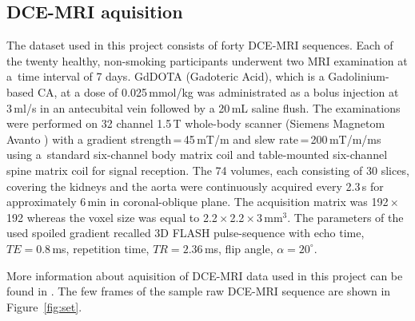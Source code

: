\subsection{DCE-MRI aquisition}
The dataset used in this project consists of forty DCE-MRI sequences. Each of the twenty healthy, non-smoking participants underwent two MRI examination at a~time interval of 7 days.
GdDOTA (Gadoteric Acid), which is a Gadolinium-based CA,  at a dose of 0.025\,mmol/kg was administrated as a bolus injection at 3\,ml/s in an antecubital vein followed by a 20\,mL saline flush.
The examinations were performed on 32 channel 1.5\,T whole-body scanner (Siemens Magnetom Avanto \cite{simens}) with a gradient strength\,=\,45\,mT/m and slew rate\,=\,200\,mT/m/ms using a~standard six-channel body matrix coil and table-mounted six-channel spine matrix coil for signal reception.
The 74 volumes, each consisting of 30 slices, covering the kidneys and the aorta were continuously acquired every 2.3\,s for approximately 6\,min in coronal-oblique plane.
The acquisition matrix was 192\,$\times$\,192 whereas the voxel size was equal to 2.2\,$\times$\,2.2\,$\times$\,3\,mm$^3$.
The parameters of the used spoiled gradient recalled 3D FLASH pulse-sequence with echo time, $TE=0.8$\,ms, repetition time, $TR=2.36$\,ms, flip angle, $\alpha= 20^{\circ}$.

More information about aquisition of DCE-MRI data used in this project can be found in \cite{eikefjord2017dynamic}.
The few frames of the sample raw DCE-MRI sequence are shown in Figure~\ref{fig:set}.
\newpage


